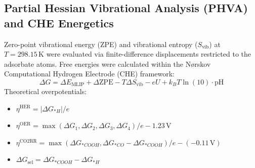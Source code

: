 \subsection{Partial Hessian Vibrational Analysis (PHVA) and CHE Energetics}
Zero-point vibrational energy (ZPE) and vibrational entropy ($S_{\mathrm{vib}}$) at $T = 298.15\,\mathrm{K}$ were evaluated via finite-difference displacements restricted to the adsorbate atoms. Free energies were calculated within the N{\o}rskov Computational Hydrogen Electrode (CHE) framework:
\begin{equation}
    \Delta G = \Delta E_{\mathrm{MLIP}} + \Delta \mathrm{ZPE} - T \Delta S_{\mathrm{vib}} - eU + k_B T \ln(10) \cdot \mathrm{pH}
\end{equation}
Theoretical overpotentials:
\begin{itemize}
    \item $\eta^{\mathrm{HER}} = |\Delta G_{*H}| / e$
    \item $\eta^{\mathrm{OER}} = \max(\Delta G_1, \Delta G_2, \Delta G_3, \Delta G_4)/e - 1.23\,\mathrm{V}$
    \item $\eta^{\mathrm{CO2RR}} = \max(\Delta G_{*COOH}, \Delta G_{*CO} - \Delta G_{*COOH})/e - (-0.11\,\mathrm{V})$
    \item $\Delta G_{\mathrm{sel}} = \Delta G_{*COOH} - \Delta G_{*H}$
\end{itemize}

